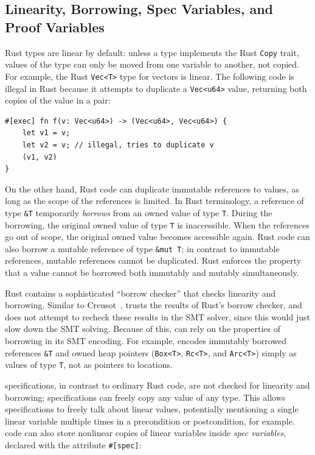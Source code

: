 \subsection{Linearity, Borrowing, Spec Variables, and Proof Variables} \label{sec:design:linearity}

Rust types are linear by default:
unless a type implements the Rust \verb`Copy` trait,
values of the type can only be moved from one variable to another, not copied.
For example, the Rust \verb`Vec<T>` type for vectors is linear.
The following code is illegal in Rust because it attempts to duplicate a \verb`Vec<u64>` value,
returning both copies of the value in a pair:

\begin{lstlisting}[language=Verus]
#[exec] fn f(v: Vec<u64>) -> (Vec<u64>, Vec<u64>) {
    let v1 = v;
    let v2 = v; // illegal, tries to duplicate v
    (v1, v2)
}
\end{lstlisting}

On the other hand, Rust code can duplicate immutable references to values,
as long as the scope of the references is limited.
In Rust terminology, a reference of type \verb`&T` temporarily {\it borrows} from
an owned value of type \verb`T`.
During the borrowing, the original owned value of type \verb`T` is inaccessible.
When the references go out of scope, the original owned value becomes accessible again.
Rust code can also borrow a mutable reference of type \verb`&mut T`;
in contrast to immutable references, mutable references cannot be duplicated.
Rust enforces the property that a value cannot be borrowed both immutably and mutably simultaneously.

Rust contains a sophisticated ``borrow checker'' that checks linearity and borrowing.
Similar to Creusot~\cite{denis:hal-03737878}, \verus trusts the results of Rust's borrow checker,
and does not attempt to recheck these results in the SMT solver,
since this would just slow down the SMT solving.
Because of this, \verus can rely on the properties of borrowing in its SMT encoding.
For example, \verus encodes immutably borrowed references \verb`&T` and owned heap pointers
(\verb`Box<T>`, \verb`Rc<T>`, and \verb`Arc<T>`) simply as values of type \verb`T`,
not as pointers to locations.

\verus specifications, in contrast to ordinary Rust code, are not checked for linearity and borrowing;
specifications can freely copy any value of any type.
This allows specifications to freely talk about linear values,
potentially mentioning a single linear variable multiple times in a precondition or postcondition,
for example.
\verus code can also store nonlinear copies of linear variables inside {\it spec variables},
declared with the attribute \verb`#[spec]`:

